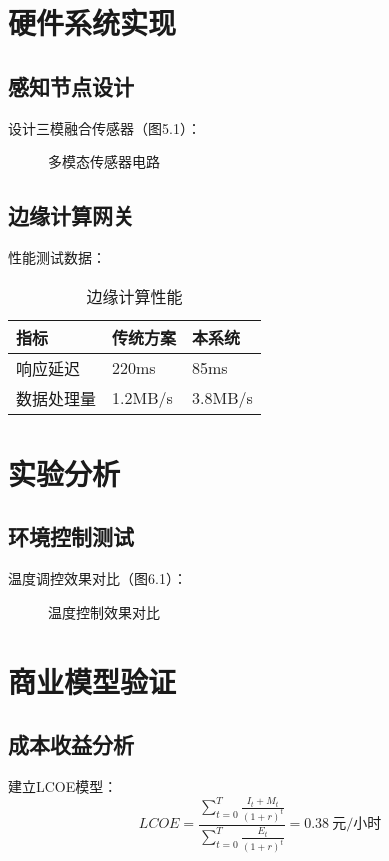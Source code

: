 \documentclass[12pt,a4paper]{IEEEtran} %
\begin{document}
\section{硬件系统实现}
\subsection{感知节点设计}
设计三模融合传感器（图5.1）：
\begin{figure}[htbp]
	\centering
	\caption{多模态传感器电路}
\end{figure}

\subsection{边缘计算网关}
性能测试数据：
\begin{table}[htbp]
	\caption{边缘计算性能}
	\begin{tabularx}{\linewidth}{lXX}
		\toprule
		指标    & 传统方案    & 本系统     \\
		\midrule
		响应延迟  & 220ms   & 85ms    \\
		数据处理量 & 1.2MB/s & 3.8MB/s \\
		\bottomrule
	\end{tabularx}
\end{table}

\section{实验分析}
\subsection{环境控制测试}
温度调控效果对比（图6.1）：
\begin{figure}[htbp]
	\centering
	\caption{温度控制效果对比}
\end{figure}

\section{商业模型验证}
\subsection{成本收益分析}
建立LCOE模型：
\begin{equation}
	LCOE = \frac{\sum_{t=0}^T \frac{I_t + M_t}{(1+r)^t}}{\sum_{t=0}^T \frac{E_t}{(1+r)^t}} = 0.38\ \text{元/小时}
\end{equation}
\end{document}
